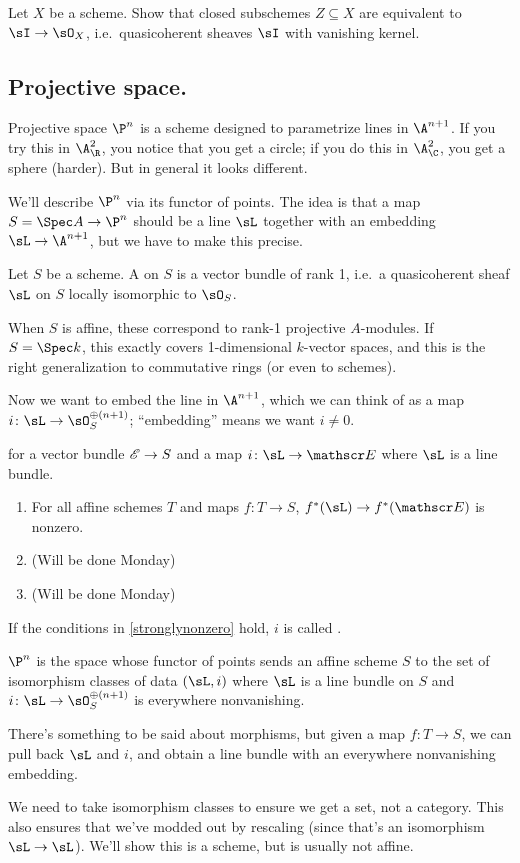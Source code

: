 \begin{ex}
Let $X$ be a scheme. Show that closed subschemes $Z\subseteq X$ are equivalent to 
$\sI\to\sO_X$, i.e.\ quasicoherent sheaves $\sI$ with vanishing kernel.
\end{ex}
\subsection*{Projective space.}
Projective space $\P^n$ is a scheme designed to parametrize lines in $\A^{n+1}$. If you try this in $\A_\R^2$, you
notice that you get a circle; if you do this in $\A_\C^2$, you get a sphere (harder). But in general it looks
different.

We'll describe $\P^n$ via its functor of points. The idea is that a map $S = \Spec A\to\P^n$ should be a line $\sL$
together with an embedding $\sL\to\A^{n+1}$, but we have to make this precise.
\begin{defn}
Let $S$ be a scheme. A  on $S$ is a vector bundle of rank 1, i.e.\ a quasicoherent sheaf $\sL$ on
$S$ locally isomorphic to $\sO_S$.
\end{defn}
When $S$ is affine, these correspond to rank-1 projective $A$-modules. If $S = \Spec k$, this exactly covers
1-dimensional $k$-vector spaces, and this is the right generalization to commutative rings (or even to schemes).

Now we want to embed the line in $\A^{n+1}$, which we can think of as a map $i\colon\sL\to\sO_S^{\oplus (n+1)}$;
``embedding'' means we want $i\ne 0$.
\begin{prop}
\label{stronglynonzero}
\TFAE{} for a vector bundle $\mathscr E\to S$ and a map $i\colon\sL\to\sE$ where $\sL$ is a line bundle.
\begin{enumerate}
	\item For all affine schemes $T$ and maps $f\colon T\to S$, $f^*(\sL)\to f^*(\sE)$ is nonzero.
	\item (Will be done Monday)
	\item (Will be done Monday)
\end{enumerate}
\end{prop}
\begin{defn}
If the conditions in \cref{stronglynonzero} hold, $i$ is called .
\end{defn}
\begin{defn}
 $\P^n$ is the space whose functor of points sends an affine scheme $S$ to the set of
isomorphism classes of data $(\sL,i)$ where $\sL$ is a line bundle on $S$ and $i\colon\sL\to\sO_S^{\oplus(n+1)}$ is
everywhere nonvanishing.
\end{defn}
There's something to be said about morphisms, but given a map $f\colon T\to S$, we can pull back $\sL$ and $i$, and
obtain a line bundle with an everywhere nonvanishing embedding.

We need to take isomorphism classes to ensure we get a set, not a category. This also ensures that we've modded out
by rescaling (since that's an isomorphism $\sL\to\sL$). We'll show this is a scheme, but is usually not affine.
